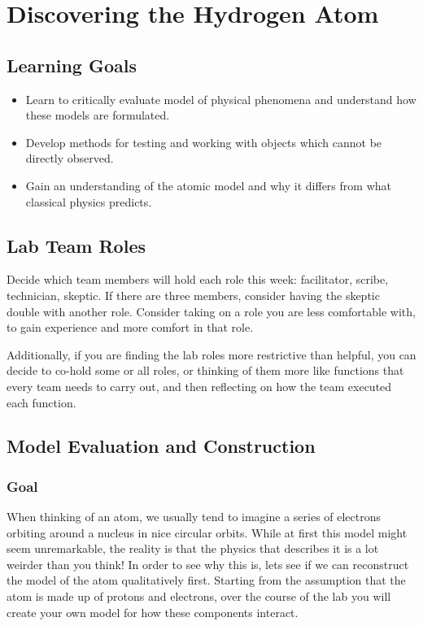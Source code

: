 \chapter{Discovering the Hydrogen Atom}

\section{Learning Goals}

\begin{itemize}
	\item Learn to critically evaluate model of physical phenomena and understand how these models are formulated.
	
	\item Develop methods for testing and working with objects which cannot be directly observed. 
	
	\item Gain an understanding of the atomic model and why it differs from what classical physics predicts.
\end{itemize}

\section{Lab Team Roles}

Decide which team members will hold each role this week: facilitator, scribe, technician, skeptic. If there are three members, consider having the skeptic double with another role. Consider taking on a role you are less comfortable with, to gain experience and more comfort in that role.

Additionally, if you are finding the lab roles more restrictive than helpful, you can decide to co-hold some or all roles, or thinking of them more like functions that every team needs to carry out, and then reflecting on how the team executed each function.

\section{Model Evaluation and Construction} %

\subsection{Goal} 
When thinking of an atom, we usually tend to imagine a series of electrons orbiting around a nucleus in nice circular orbits. While at first this model might seem unremarkable, the reality is that the physics that describes it is a lot weirder than you think! In order to see why this is, lets see if we can reconstruct the model of the atom qualitatively first. Starting from the assumption that the atom is made up of protons and electrons, over the course of the lab you will create your own model for how these components interact.


